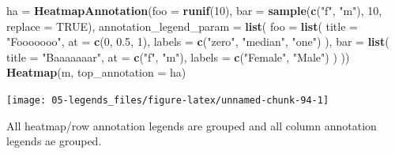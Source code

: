 \documentclass[]{book}
\newenvironment{Shaded}{\begin{snugshade}}{\end{snugshade}}
\newcommand{\KeywordTok}[1]{\textcolor[rgb]{0.13,0.29,0.53}{\textbf{#1}}}
\newcommand{\DataTypeTok}[1]{\textcolor[rgb]{0.13,0.29,0.53}{#1}}
\newcommand{\DecValTok}[1]{\textcolor[rgb]{0.00,0.00,0.81}{#1}}
\newcommand{\FloatTok}[1]{\textcolor[rgb]{0.00,0.00,0.81}{#1}}
\newcommand{\StringTok}[1]{\textcolor[rgb]{0.31,0.60,0.02}{#1}}
\newcommand{\OtherTok}[1]{\textcolor[rgb]{0.56,0.35,0.01}{#1}}
\newcommand{\NormalTok}[1]{#1}
\theoremstyle{definition}
\theoremstyle{definition}
\theoremstyle{definition}
\theoremstyle{remark}
\begin{document}
\begin{Shaded}
\begin{Highlighting}[]
\NormalTok{ha =}\StringTok{ }\KeywordTok{HeatmapAnnotation}\NormalTok{(}\DataTypeTok{foo =} \KeywordTok{runif}\NormalTok{(}\DecValTok{10}\NormalTok{), }\DataTypeTok{bar =} \KeywordTok{sample}\NormalTok{(}\KeywordTok{c}\NormalTok{(}\StringTok{"f"}\NormalTok{, }\StringTok{"m"}\NormalTok{), }\DecValTok{10}\NormalTok{, }\DataTypeTok{replace =} \OtherTok{TRUE}\NormalTok{),}
    \DataTypeTok{annotation_legend_param =} \KeywordTok{list}\NormalTok{(}
        \DataTypeTok{foo =} \KeywordTok{list}\NormalTok{(}
                \DataTypeTok{title =} \StringTok{"Fooooooo"}\NormalTok{,}
                \DataTypeTok{at =} \KeywordTok{c}\NormalTok{(}\DecValTok{0}\NormalTok{, }\FloatTok{0.5}\NormalTok{, }\DecValTok{1}\NormalTok{),}
                \DataTypeTok{labels =} \KeywordTok{c}\NormalTok{(}\StringTok{"zero"}\NormalTok{, }\StringTok{"median"}\NormalTok{, }\StringTok{"one"}\NormalTok{)}
\NormalTok{            ),}
        \DataTypeTok{bar =} \KeywordTok{list}\NormalTok{(}
                \DataTypeTok{title =} \StringTok{"Baaaaaaar"}\NormalTok{,}
                \DataTypeTok{at =} \KeywordTok{c}\NormalTok{(}\StringTok{"f"}\NormalTok{, }\StringTok{"m"}\NormalTok{),}
                \DataTypeTok{labels =} \KeywordTok{c}\NormalTok{(}\StringTok{"Female"}\NormalTok{, }\StringTok{"Male"}\NormalTok{)}
\NormalTok{            )}
\NormalTok{))}
\KeywordTok{Heatmap}\NormalTok{(m, }\DataTypeTok{top_annotation =}\NormalTok{ ha)}
\end{Highlighting}
\end{Shaded}

\begin{center}\texttt{[image: 05-legends\_files/figure-latex/unnamed-chunk-94-1]} \end{center}

All heatmap/row annotation legends are grouped and all column annotation
legends ae grouped.
\end{document}
